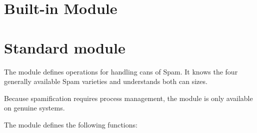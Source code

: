 


\section{Built-in Module }	%

\section{Standard module }	%

\label{module-spam}


The  module defines operations for handling cans of Spam.
It knows the four generally available Spam varieties and understands
both can sizes.

Because spamification requires \UNIX{} process management, the module
is only available on genuine \UNIX{} systems.



The  module defines the following functions:


\renewcommand{\indexsubitem}{(in module spam)}


